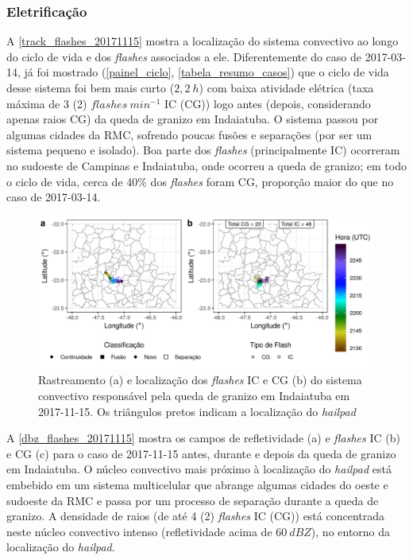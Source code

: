 \subsubsection{Eletrificação}\label{elec_20171115}

A \autoref{track_flashes_20171115} mostra a localização do sistema convectivo ao longo do ciclo de vida e dos \textit{flashes} associados a ele. Diferentemente do caso de 2017-03-14, já foi mostrado (\autoref{painel_ciclo}, \autoref{tabela_resumo_casos}) que o ciclo de vida desse sistema foi bem mais curto ($2,2\:h$) com baixa atividade elétrica (taxa máxima de 3 (2) $flashes\:min^{-1}$ IC (CG)) logo antes (depois, considerando apenas raios CG) da queda de granizo em Indaiatuba. O sistema passou por algumas cidades da RMC, sofrendo poucas fusões e separações (por ser um sistema pequeno e isolado). Boa parte dos \textit{flashes} (principalmente IC) ocorreram no sudoeste de Campinas e Indaiatuba, onde ocorreu a queda de granizo; em todo o ciclo de vida, cerca de 40\% dos \textit{flashes} foram CG, proporção maior do que no caso de 2017-03-14.

\begin{figure}[htb]
	\begin{center}
		\caption{Rastreamento (a) e localização dos \textit{flashes} IC e CG (b) do sistema convectivo responsável pela queda de granizo em Indaiatuba em 2017-11-15. Os triângulos pretos indicam a localização do \textit{hailpad}} 
		\label{track_flashes_20171115}
		\includegraphics[width=\columnwidth]{../General_Processing/figures/track_flashes_20171115_ptbr.png}
	\end{center}
\end{figure}

A \autoref{dbz_flashes_20171115} mostra os campos de refletividade (a) e \textit{flashes} IC (b) e CG (c) para o caso de 2017-11-15 antes, durante e depois da queda de granizo em Indaiatuba. O núcleo convectivo mais próximo à localização do \textit{hailpad} está embebido em um sistema multicelular que abrange algumas cidades do oeste e sudoeste da RMC e passa por um processo de separação durante a queda de granizo. A densidade de raios (de até 4 (2) \textit{flashes} IC (CG)) está concentrada neste núcleo convectivo intenso (refletividade acima de $60\:dBZ$), no entorno da localização do \textit{hailpad}.

